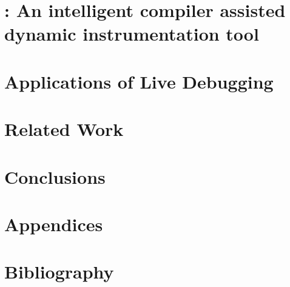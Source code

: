 \documentclass[11pt,openright,twoside,letterpaper,onecolumn]{report} %
\begin{document}
\part{\iprobe: An intelligent compiler assisted dynamic instrumentation tool}


\part{Applications of Live Debugging}


\part{Related Work}


\part{Conclusions}


\part{Appendices}
\appendix

%

\part{Bibliography}

 
\end{document}
